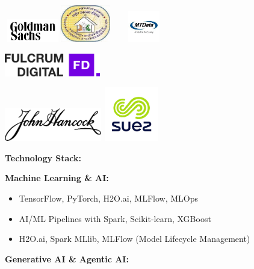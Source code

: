 \documentclass[a4paper]{article}
\begin{document}
\includegraphics[width=0.95588in,height=0.39885in]{media/image16.png}\includegraphics[width=0.86736in,height=0.65in]{media/image17.jpg}\includegraphics[width=1.17569in,height=0.54236in]{media/image18.jpg}

\includegraphics[width=1.64288in,height=0.39444in]{media/image19.png}

\includegraphics[width=1.67157in,height=0.56151in]{media/image20.png}\includegraphics[width=1.04412in,height=0.92436in]{media/image21.png}

\textbf{Technology Stack:}

\textbf{Machine Learning \& AI:}

\begin{itemize}
\item
  TensorFlow, PyTorch, H2O.ai, MLFlow, MLOps
\end{itemize}

\begin{itemize}
\item
  AI/ML Pipelines with Spark, Scikit-learn, XGBoost
\item
  H2O.ai, Spark MLlib, MLFlow (Model Lifecycle Management)
\end{itemize}

\textbf{Generative AI \& Agentic AI:}
\end{document}
